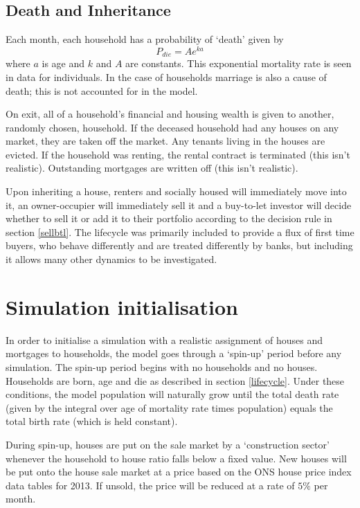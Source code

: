 \documentclass{report}
\begin{document}
\subsection{Death and Inheritance}
Each month, each household has a probability of `death' given by
\begin{equation}
P_{die} = Ae^{ka}
\label{mortality}
\end{equation}
where $a$ is age and $k$ and $A$ are constants. This exponential mortality rate is seen in data for individuals. In the case of households marriage is also a cause of death; this is not accounted for in the model.

On exit, all of a household's financial and housing wealth is given to another, randomly chosen, household. If the deceased household had any houses on any market, they are taken off the market. Any tenants living in the houses are evicted. If the household was renting, the rental contract is terminated (this isn't realistic). Outstanding mortgages are written off (this isn't realistic).

Upon inheriting a house, renters and socially housed will immediately move into it, an owner-occupier will immediately sell it and a buy-to-let investor will decide whether to sell it or add it to their portfolio according to the decision rule in section \ref{sellbtl}.
The lifecycle was primarily included to provide a flux of first time buyers, who behave differently and are treated differently by banks, but including it allows many other dynamics to be investigated.
 
\section{Simulation initialisation}
In order to initialise a simulation with a realistic assignment of houses and mortgages to households, the model goes through a `spin-up' period before any simulation. The spin-up period begins with no households and no houses. Households are born, age and die as described in section \ref{lifecycle}. Under these conditions, the model population will naturally grow until the total death rate (given by the integral over age of mortality rate times population) equals the total birth rate (which is held constant).

During spin-up, houses are put on the sale market by a `construction sector' whenever the household to house ratio falls below a fixed value. New houses will be put onto the house sale market at a price based on the ONS house price index data tables for 2013. If unsold, the price will be reduced at a rate of $5\%$ per month.
\end{document}
